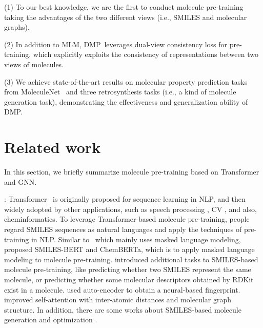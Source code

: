\documentclass{article}
\newcommand{\ourM}{DMP}
\begin{document}
\noindent(1) To our best knowledge, we are the first to conduct molecule pre-training taking the advantages of the two different views (i.e., SMILES and molecular graphs).

\noindent(2) In addition to MLM, \ourM{}~leverages dual-view consistency loss for pre-training, which explicitly exploits the consistency of representations between two views of molecules.

\noindent(3) We achieve state-of-the-art results on  molecular property prediction tasks from MoleculeNet~\cite{wu2018moleculenet} and three retrosynthesis tasks (i.e., a kind of molecule generation task), demonstrating the effectiveness and generalization ability of \ourM{}. 



\section{Related work}


In this section, we briefly summarize molecule pre-training based on Transformer and GNN. 

: Transformer~\cite{vaswani2017attention} is originally proposed for sequence learning in NLP, and then widely adopted by other applications, such as speech processing \cite{8462506,NEURIPS2019_f63f65b5}, CV \citep{dosovitskiy2021an,image2018imagetransformer}, and also, cheminformatics. To leverage Transformer-based molecule pre-training, people regard SMILES sequences as natural languages and apply the techniques of pre-training in NLP. Similar to~\cite{devlin2018bert,liu2019roberta} which mainly uses masked language modeling, \citet{wang2019smiles} proposed SMILES-BERT and \citet{chithrananda2020chemberta} ChemBERTa, which is to apply masked language modeling to molecule pre-training. 
\citet{fabian2020molecular} introduced additional tasks to SMILES-based molecule pre-training, like predicting whether two SMILES represent the same molecule, or predicting whether some molecular descriptors obtained by RDKit exist in a molecule.
\citet{honda2019smiles} used auto-encoder to obtain a neural-based fingerprint. \citet{maziarka2020molecule} improved self-attention with inter-atomic distances and molecular graph structure. In addition, there are some works about SMILES-based molecule generation \citep{schwaller2019molecular,pesciullesi2020transfer} and optimization \citep{he2021transformer}. 
\end{document}
